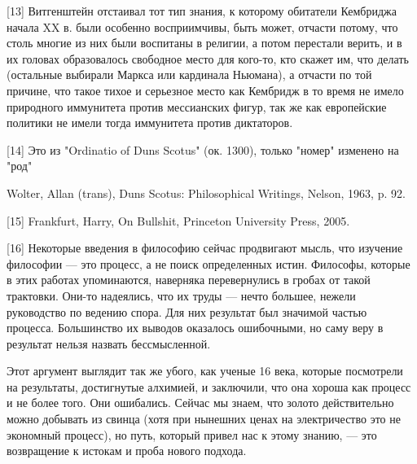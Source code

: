 \documentclass[ebook,12pt,oneside,openany]{memoir}
\begin{document}
[13] Витгенштейн отстаивал тот тип знания, к которому обитатели
Кембриджа начала XX в. были особенно восприимчивы, быть может, отчасти
потому, что столь многие из них были воспитаны в религии, а потом
перестали верить, и в их головах образовалось свободное место для
кого-то, кто скажет им, что делать (остальные выбирали Маркса или
кардинала Ньюмана), а отчасти по той причине, что такое тихое и
серьезное место как Кембридж в то время не имело природного иммунитета
против мессианских фигур, так же как европейские политики не имели
тогда иммунитета против диктаторов.

[14] Это из "Ordinatio of Duns Scotus" (ок. 1300), только "номер"
изменено на "род"

Wolter, Allan (trans), Duns Scotus: Philosophical Writings, Nelson,
1963, p. 92.

[15] Frankfurt, Harry, On Bullshit, Princeton University Press, 2005.

[16] Некоторые введения в философию сейчас продвигают мысль, что
изучение философии — это процесс, а не поиск определенных истин.
Философы, которые в этих работах упоминаются, наверняка перевернулись
в гробах от такой трактовки. Они-то надеялись, что их труды — нечто
большее, нежели руководство по ведению спора. Для них результат был
значимой частью процесса. Большинство их выводов оказалось ошибочными,
но саму веру в результат нельзя назвать бессмысленной.

Этот аргумент выглядит так же убого, как ученые 16 века, которые
посмотрели на результаты, достигнутые алхимией, и заключили, что она
хороша как процесс и не более того. Они ошибались. Сейчас мы знаем,
что золото действительно можно добывать из свинца (хотя при нынешних
ценах на электричество это не экономный процесс), но путь, который
привел нас к этому знанию, — это возвращение к истокам и проба нового
подхода.
\end{document}
